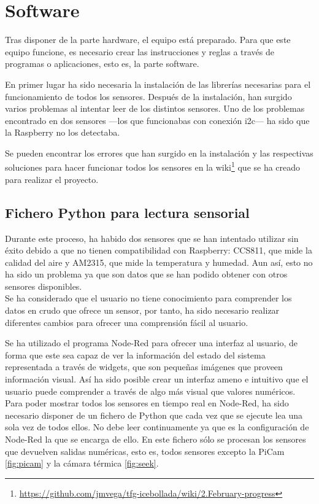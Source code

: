 \section{Software}
Tras disponer de la parte hardware, el equipo está preparado. Para que este equipo funcione, es necesario crear las instrucciones y reglas a través de programas o aplicaciones, esto es, la parte software.

En primer lugar ha sido necesaria la instalación de las librerías necesarias para el funcionamiento de todos los sensores. Después de la instalación, han surgido varios problemas al intentar leer de los distintos sensores. Uno de los problemas encontrado en dos sensores ---los que funcionabas con conexión i2c--- ha sido que la Raspberry no los detectaba.

Se pueden encontrar los errores que han surgido en la instalación y las respectivas soluciones para hacer funcionar todos los sensores en la wiki\footnote{\url{https://github.com/jmvega/tfg-icebollada/wiki/2.February-progress}} que se ha creado para realizar el proyecto.\\

\subsection{Fichero Python para lectura sensorial}
Durante este proceso, ha habido dos sensores que se han intentado utilizar sin éxito debido a que no tienen compatibilidad con Raspberry: CCS811, que mide la calidad del aire y AM2315, que mide la temperatura y humedad. Aun así, esto no ha sido un problema ya que son datos que se han podido obtener con otros sensores disponibles.\\

Se ha considerado que el usuario no tiene conocimiento para comprender los datos en crudo que ofrece un sensor, por tanto, ha sido necesario realizar diferentes cambios para ofrecer una comprensión fácil al usuario.

Se ha utilizado el programa Node-Red para ofrecer una interfaz al usuario, de forma que este sea capaz de ver la información del estado del sistema representada a través de widgets, que son pequeñas imágenes que proveen información visual. Así ha sido posible crear un interfaz ameno e intuitivo que el usuario puede comprender a través de algo más visual que valores numéricos.\\

Para poder mostrar todos los sensores en tiempo real en Node-Red, ha sido necesario disponer de un fichero de Python que  cada vez que se ejecute lea una sola vez de todos ellos. No debe leer continuamente ya que es la configuración de Node-Red la que se encarga de ello. En este fichero sólo se procesan los sensores que devuelven salidas numéricas, esto es, todos sensores excepto la PiCam \ref{fig:picam} y la cámara térmica \ref{fig:seek}. 

